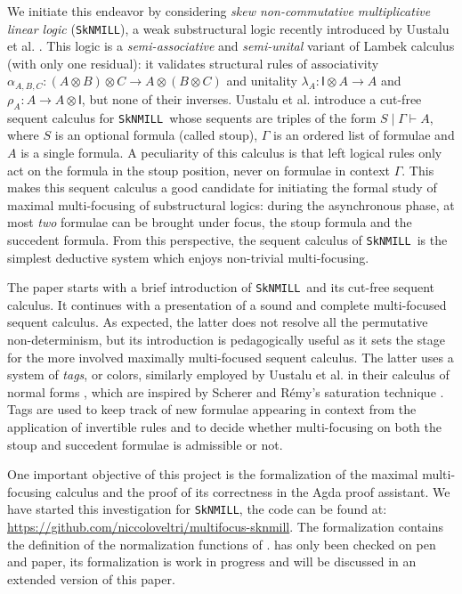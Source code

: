 \documentclass[runningheads]{llncs}
\newcommand{\ot}{\otimes}
\newcommand{\I}{\mathsf{I}}
\newcommand{\SkNMILL}{\texttt{SkNMILL}}
\begin{document}
We initiate this endeavor by considering \emph{skew non-commutative multiplicative linear logic} (\SkNMILL), a weak substructural logic recently introduced by Uustalu et al. \cite{UVW:protsn}. This logic is a \emph{semi-associative} and \emph{semi-unital} variant of Lambek calculus (with only one residual): it validates structural rules of associativity $\alpha_{A,B,C} : (A \ot B) \ot C \to A \ot (B \ot C)$ and unitality $\lambda_A : \I \ot A \to A$ and $\rho_A : A \to A \ot \I$, but none of their inverses. Uustalu et al. introduce a cut-free sequent calculus for \SkNMILL\ whose sequents are triples of the form $S \mid \Gamma \vdash A$, where $S$ is an optional formula (called stoup), $\Gamma$ is an ordered list of formulae and $A$ is a single formula. A peculiarity of this calculus is that left logical rules only act on the formula in the stoup position, never on formulae in context $\Gamma$. This makes this sequent calculus a good candidate for initiating the formal study of maximal multi-focusing of substructural logics: during the asynchronous phase, at most \emph{two} formulae can be brought under focus, the stoup formula and the succedent formula. From this perspective, the sequent calculus of \SkNMILL\ is the simplest deductive system which enjoys non-trivial multi-focusing.

The paper starts with a brief introduction of \SkNMILL\ and its cut-free sequent calculus. It continues with a presentation of a sound and complete multi-focused sequent calculus. As expected, the latter does not resolve all the permutative non-determinism, but its introduction is pedagogically useful as it sets the stage for the more involved maximally multi-focused sequent calculus. The latter uses a system of \emph{tags}, or colors, similarly employed by Uustalu et al. in their calculus of normal forms \cite{UVW:protsn}, which are inspired by Scherer and R{\'e}my's saturation technique \cite{scherer:simple:2015}.
Tags are used to keep track of new formulae appearing in context from the application of invertible rules and to decide whether multi-focusing on both the stoup and succedent formulae is admissible or not.

One important objective of this project is the formalization of the maximal multi-focusing calculus and the proof of its correctness in the Agda proof assistant. We have started this investigation for \SkNMILL, the code can be found at: \url{https://github.com/niccoloveltri/multifocus-sknmill}. The formalization contains the definition of the normalization functions of .  has only been checked on pen and paper, its formalization is work in progress and will be discussed in an extended version of this paper.
\end{document}
